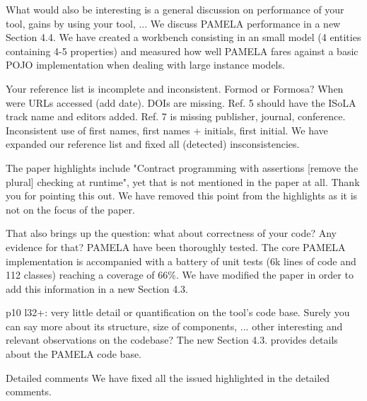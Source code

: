 \documentclass[10pt]{article}
\begin{document}
\begin{response}{What would also be interesting is a general discussion on performance of your tool, gains by using your tool, ...
} We discuss PAMELA performance in a new Section 4.4. We have created a workbench consisting in an small model (4 entities containing 4-5 properties) and measured how well PAMELA fares against a basic POJO implementation when dealing with large instance models.
\end{response}

\begin{response}{Your reference list is incomplete and inconsistent. Formod or Formosa? When were URLs accessed (add date). DOIs are missing. Ref. 5 should have the ISoLA track name and editors added. Ref. 7 is missing publisher, journal, conference. Inconsistent use of first names, first names + initials, first initial.}
We have expanded our reference list and fixed all (detected) insconsistencies.
\end{response}

\begin{response}{The paper highlights include "Contract programming with assertions [remove the plural] checking at runtime", yet that is not mentioned in the paper at all.
} Thank you for pointing this out. We have removed this point from the highlights as it is not on the focus of the paper.
\end{response}

\begin{response}{That also brings up the question: what about correctness of your code? Any evidence for that?}
PAMELA have been thoroughly tested. The core PAMELA implementation is accompanied with a battery of unit tests (6k lines of code and 112 classes) reaching a coverage of 66\%. We have modified the paper in order to add this information in a new Section 4.3.
\end{response}

\begin{response}{p10 l32+: very little detail or quantification on the tool's code base. Surely you can say more about its structure, size of components, ... other interesting and relevant observations on the codebase?}
The new Section 4.3. provides details about the PAMELA code base.
\end{response}

\begin{response}{Detailed comments}
We have fixed all the issued highlighted in the detailed comments.
\end{response}
\end{document}

